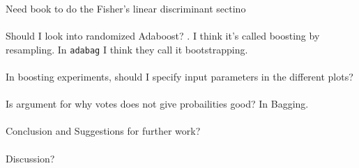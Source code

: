 Need book to do the Fisher's linear discriminant sectino\\
\\
Should I look into randomized Adaboost? \cite{freund1996}. I think it's called boosting by resampling. In \verb+adabag+ I think they call it bootstrapping.\\
\\
In boosting experiments, should I specify input parameters in the different plots? \\
\\
Is argument for why votes does not give probailities good? In Bagging.\\
\\
Conclusion and Suggestions for further work?\\
\\
Discussion?\\
\\
